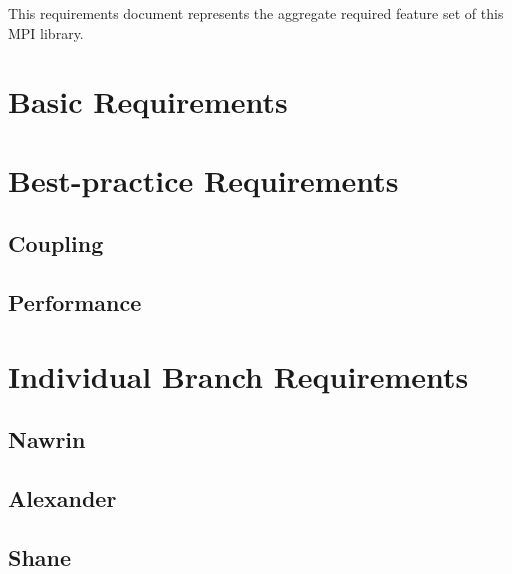 \documentclass{article}
\begin{document}
This requirements document represents the aggregate required feature set of this MPI library.

\section{Basic Requirements}

\section{Best-practice Requirements}

\subsection{Coupling}

\subsection{Performance}

\section{Individual Branch Requirements}

\subsection{Nawrin}

\subsection{Alexander}

\subsection{Shane}
\end{document}
